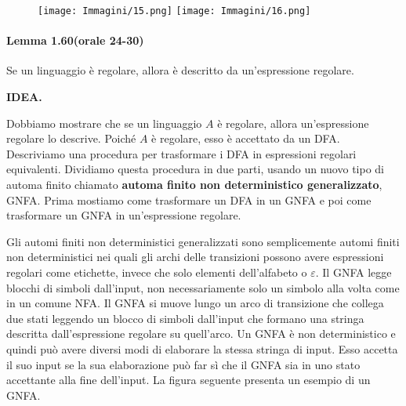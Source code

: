 \documentclass{article}
\begin{document}
\begin{figure}[H]
    \centering
    \texttt{[image: Immagini/15.png]}
    \texttt{[image: Immagini/16.png]}
    \label{fig:your_image}
\end{figure}

\paragraph{Lemma 1.60(orale 24-30)}
\label{lemma-1.60}
\text{  }
\begin{tcolorbox}[title=Lemma 1.60 (orale 24-30)]
    Se un linguaggio è regolare, allora è descritto da un'espressione regolare.
\end{tcolorbox}

\textbf{IDEA.}

Dobbiamo mostrare che se un linguaggio $A$ è regolare, allora un'espressione regolare lo descrive. 
Poiché $A$ è regolare, esso è accettato da un DFA. 
Descriviamo una procedura per trasformare i DFA in espressioni regolari equivalenti. 
Dividiamo questa procedura in due parti, usando un nuovo tipo di automa finito chiamato \textbf{automa finito non deterministico generalizzato}, GNFA.
Prima mostiamo come trasformare un DFA in un GNFA e poi come trasformare un GNFA in un'espressione regolare.

Gli automi finiti non deterministici generalizzati sono semplicemente automi finiti non deterministici nei quali gli archi delle transizioni possono
avere espressioni regolari come etichette, invece che solo elementi dell'alfabeto o $\varepsilon$. 
Il GNFA legge blocchi di simboli dall'input, non necessariamente solo un simbolo alla volta come in un comune NFA. 
Il GNFA si muove lungo un arco di transizione che collega due stati leggendo un blocco di simboli dall'input che formano una stringa descritta dall'espressione regolare su quell'arco. 
Un GNFA è non deterministico e quindi può avere diversi modi di elaborare la stessa stringa di input.
Esso accetta il suo input se la sua elaborazione può far sì che il GNFA sia in uno stato accettante alla fine dell'input. 
La figura seguente presenta un esempio di un GNFA.
\end{document}
